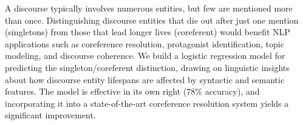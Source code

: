 A discourse typically involves numerous entities, but few are mentioned more than once. Distinguishing discourse entities that die out after just one
 mention (singletons) from those that lead longer lives (coreferent) would
 benefit NLP applications such as coreference resolution, protagonist
 identification, topic modeling, and discourse coherence. We build a logistic
 regression model for predicting the singleton/coreferent distinction, drawing
 on linguistic insights about how discourse entity lifespans
 are affected by syntactic and semantic features. The model is effective in its
 own right (78\% accuracy), and incorporating it into a state-of-the-art
 coreference resolution system yields a significant improvement.

